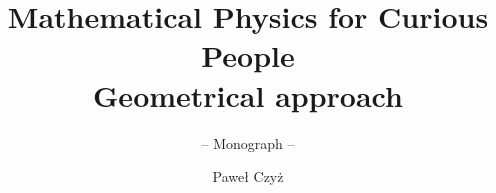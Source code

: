 \documentclass[envcountsame,envcountchap]{svmono}
\begin{document}
\author{Paweł Czyż}
\title{Mathematical Physics for Curious People\\
{\small Geometrical approach}}
\subtitle{-- Monograph --}
\maketitle

\frontmatter%




\tableofcontents

\mainmatter%












% 


%
%

\backmatter%
% 

\printindex

\end{document}
